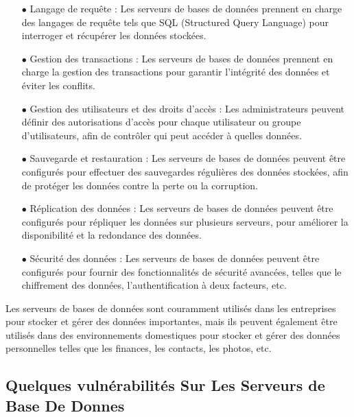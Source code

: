 \begin{enumerate}
	
 \item[$\bullet$] Langage de requête : Les serveurs de bases de données prennent en charge des langages de requête tels que SQL (Structured Query Language) pour interroger et récupérer les données stockées.
 
 \item[$\bullet$] Gestion des transactions : Les serveurs de bases de données prennent en charge la gestion des transactions pour garantir l'intégrité des données et éviter les conflits.
 
 \item[$\bullet$] Gestion des utilisateurs et des droits d'accès : Les administrateurs peuvent définir des autorisations d'accès pour chaque utilisateur ou groupe d'utilisateurs, afin de contrôler qui peut accéder à quelles données.
 
  \item[$\bullet$] Sauvegarde et restauration : Les serveurs de bases de données peuvent être configurés pour effectuer des sauvegardes régulières des données stockées, afin de protéger les données contre la perte ou la corruption.
 
\item[$\bullet$] Réplication des données : Les serveurs de bases de données peuvent être configurés pour répliquer les données sur plusieurs serveurs, pour améliorer la disponibilité et la redondance des données.
 
 \item[$\bullet$] Sécurité des données : Les serveurs de bases de données peuvent être configurés pour fournir des fonctionnalités de sécurité avancées, telles que le chiffrement des données, l'authentification à deux facteurs, etc.
 
\end{enumerate}

Les serveurs de bases de données sont couramment utilisés dans les entreprises pour stocker et gérer des données importantes, mais ils peuvent également être utilisés dans des environnements domestiques pour stocker et gérer des données personnelles telles que les finances, les contacts, les photos, etc.

\subsection{Quelques vulnérabilités Sur Les Serveurs de Base De Donnes }

